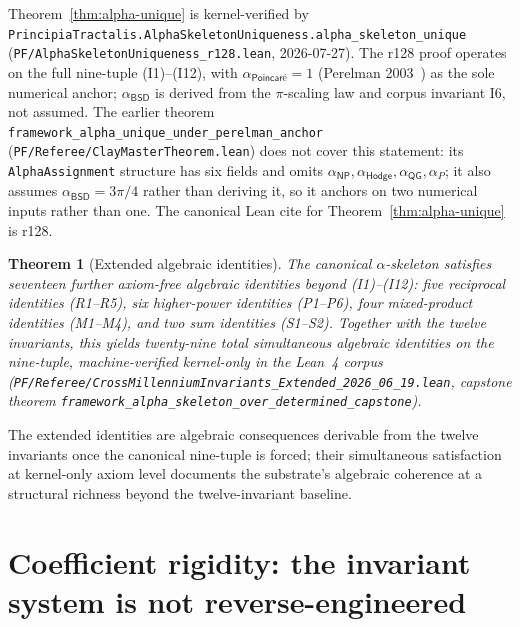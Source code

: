 \documentclass[11pt,a4paper]{amsart}
\theoremstyle{plain}
\newtheorem{theorem}{Theorem}[section]
\theoremstyle{definition}
\begin{document}
Theorem~\ref{thm:alpha-unique} is kernel-verified by
\texttt{PrincipiaTractalis.AlphaSkeletonUniqueness.alpha\_skeleton\_unique}
(\texttt{PF/AlphaSkeletonUniqueness\_r128.lean}, 2026-07-27). The r128
proof operates on the full nine-tuple \textup{(I1)--(I12)}, with
$\alpha_{\textsf{Poincar\'e}} = 1$ (Perelman 2003~\cite{perelman2003}) as
the sole numerical anchor; $\alpha_{\textsf{BSD}}$ is derived from the
$\pi$-scaling law and corpus invariant I6, not assumed.
The earlier theorem \texttt{framework\_alpha\_unique\_under\_perelman\_anchor}
(\texttt{PF/Referee/ClayMasterTheorem.lean}) does not cover this statement:
its \texttt{AlphaAssignment} structure has six fields and omits
$\alpha_{\textsf{NP}}, \alpha_{\textsf{Hodge}}, \alpha_{\textsf{QG}},
\alpha_{P}$; it also assumes $\alpha_{\textsf{BSD}} = 3\pi/4$ rather than
deriving it, so it anchors on two numerical inputs rather than one.
The canonical Lean cite for Theorem~\ref{thm:alpha-unique} is r128.

\begin{theorem}[Extended algebraic identities]\label{thm:extended-invariants}
The canonical $\alpha$-skeleton satisfies seventeen further axiom-free algebraic identities beyond \textup{(I1)--(I12)}: five reciprocal identities (R1--R5), six higher-power identities (P1--P6), four mixed-product identities (M1--M4), and two sum identities (S1--S2). Together with the twelve invariants, this yields twenty-nine total simultaneous algebraic identities on the nine-tuple, machine-verified kernel-only in the Lean~4 corpus (\texttt{PF/Referee/CrossMillenniumInvariants\_Extended\_2026\_06\_19.lean}, capstone theorem \texttt{framework\_alpha\_skeleton\_over\_determined\_capstone}).
\end{theorem}

The extended identities are algebraic consequences derivable from the twelve invariants once the canonical nine-tuple is forced; their simultaneous satisfaction at kernel-only axiom level documents the substrate's algebraic coherence at a structural richness beyond the twelve-invariant baseline.

\section{Coefficient rigidity: the invariant system is not reverse-engineered}\label{sec:coefficient-rigidity}
\end{document}

